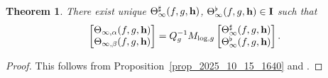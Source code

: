 \documentclass{amsart}
\numberwithin{equation}{section}
\newtheorem{theorem}{Theorem}[section]
\newcommand{\h}{\textup{\bf h}}
\begin{document}
\begin{theorem}
    \label{thm_2025_10_16_0900}
     There exist unique $\Theta_{\infty}^\sharp(f,g,\h)$, $\Theta_{\infty}^\flat(f,g,\h) \in \mathbf{I}$ such that
    \[
    \begin{bmatrix}
      \Theta_{\infty,\alpha}(f,g,\h)\\  
      \Theta_{\infty,\beta}(f,g,\h)\end{bmatrix}=Q_g^{-1}M_{\log,g}
\begin{bmatrix}
      \Theta_{\infty}^\sharp(f,g,\h)\\  
      \Theta_{\infty}^\flat(f,g,\h)
\end{bmatrix}    .
    \]
\end{theorem}
\begin{proof}
    This follows from Proposition~\ref{prop_2025_10_15_1640} and \cite[Theorem~3.4]{BBL1}.
\end{proof}   



 



\end{document}
